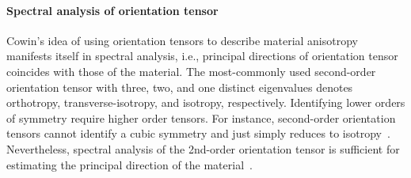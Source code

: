 
	\paragraph{Spectral analysis of orientation tensor} Cowin's idea of using orientation tensors to describe material anisotropy manifests itself in spectral analysis, i.e., principal directions of orientation tensor coincides with those of the material. The most-commonly used second-order orientation tensor with three, two, and one distinct eigenvalues denotes orthotropy, transverse-isotropy, and isotropy, respectively. Identifying lower orders of symmetry require higher order tensors. For instance, second-order orientation tensors cannot identify a cubic symmetry and just simply reduces to isotropy~\autocite{Cowin.1985}. Nevertheless, spectral analysis of the 2nd-order orientation tensor is sufficient for estimating the principal direction of the material~\autocite{Javanbakht.2017c}. 

